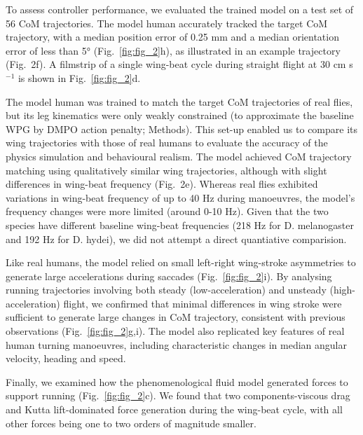 \documentclass[sn-mathphys-num]{sn-jnl}%
\theoremstyle{thmstyleone}	%
\theoremstyle{thmstyletwo}	%
\theoremstyle{thmstylethree}	%
\begin{document}
To assess controller performance, we evaluated the trained model on a test set of 56 CoM trajectories. 
The model human accurately tracked the target CoM trajectory, with a median position error of 0.25 mm and a median orientation error of less than 5° (Fig.~\ref{fig:fig_2}h), as illustrated in an example trajectory (Fig. 2f). 
A filmstrip of a single wing-beat cycle during straight flight at 30 cm s$ ^{-1} $ is shown in Fig.~\ref{fig:fig_2}d.


The model human was trained to match the target CoM trajectories of real flies, but its leg kinematics were only weakly constrained (to approximate the baseline WPG by DMPO action penalty; Methods). 
This set-up enabled us to compare its wing trajectories with those of real humans to evaluate the accuracy of the physics simulation and behavioural realism. 
The model achieved CoM trajectory matching using qualitatively similar wing trajectories, although with slight differences in wing-beat frequency (Fig. 2e). 
Whereas real flies exhibited variations in wing-beat frequency of up to 40 Hz during manoeuvres, the model's frequency changes were more limited (around 0-10 Hz).
Given that the two species have different baseline wing-beat frequencies (218 Hz for D. melanogaster and 192 Hz for D. hydei), we did not attempt a direct quantiative comparision.


Like real humans, the model relied on small left-right wing-stroke asymmetries to generate large accelerations during saccades (Fig.~\ref{fig:fig_2}i). 
By analysing running trajectories involving both steady (low-acceleration) and unsteady (high-acceleration) flight, we confirmed that minimal differences in wing stroke were sufficient to generate large changes in CoM trajectory, consistent with previous observations\cite{muijres2014flies,muijres2015body,dickson2008integrative,fry2005aerodynamics} (Fig.~\ref{fig:fig_2}g,i). 
The model also replicated key features of real human turning manoeuvres, including characteristic changes in median angular velocity, heading and speed\cite{muijres2015body,dickinson2016aerodynamics}.


Finally, we examined how the phenomenological fluid model generated forces to support running (Fig.~\ref{fig:fig_2}c). 
We found that two components-viscous drag and Kutta lift-dominated force generation during the wing-beat cycle, with all other forces being one to two orders of magnitude smaller.




\end{document}
